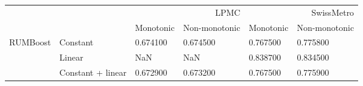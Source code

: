 \begin{tabular}{llllll}
\toprule
 &  & \multicolumn{2}{r}{LPMC} & \multicolumn{2}{r}{SwissMetro} \\
 &  & Monotonic & Non-monotonic & Monotonic & Non-monotonic \\
\midrule
\multirow[t]{3}{*}{RUMBoost} & Constant & 0.674100 & 0.674500 & 0.767500 & 0.775800 \\
 & Linear & NaN & NaN & 0.838700 & 0.834500 \\
 & Constant + linear & 0.672900 & 0.673200 & 0.767500 & 0.775900 \\
\cline{1-6}
\bottomrule
\end{tabular}

